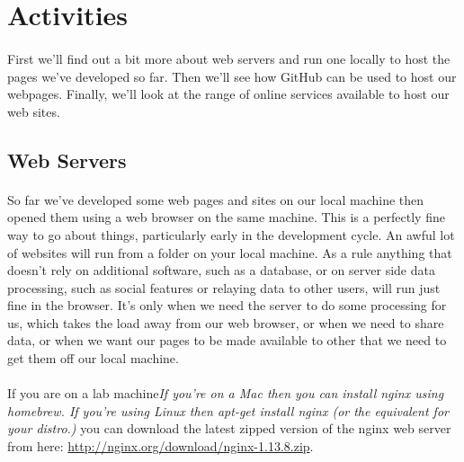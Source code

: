 \documentclass[10pt, a4paper, twosize]{article}
\begin{document}


\section{Activities}
\paragraph{} First we'll find out a bit more about web servers and run one locally to host the pages we've developed so far. Then we'll see how GitHub can be used to host our webpages. Finally, we'll look at the range of online services available to host our web sites.

\subsection{Web Servers}
\paragraph{} So far we've developed some web pages and sites on our local machine then opened them using a web browser on the same machine. This is a perfectly fine way to go about things, particularly early in the development cycle. An awful lot of websites will run from a folder on your local machine. As a rule anything that doesn't rely on additional software, such as a database, or on server side data processing, such as social features or relaying data to other users, will run just fine in the browser. It's only when we need the server to do some processing for us, which takes the load away from our web browser, or when we need to share data, or when we want our pages to be made available to other that we need to get them off our local machine.

\paragraph{} If you are on a lab machine\emph{If you're on a Mac then you can install nginx using homebrew. If you're using Linux then apt-get install nginx (or the equivalent for your distro.)} you can download the latest zipped version of the nginx web server from here: \url{http://nginx.org/download/nginx-1.13.8.zip}.
\end{document}
